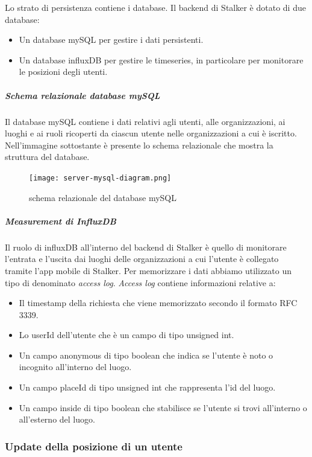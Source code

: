 \documentclass[../manuale-manutentore.tex]{subfiles}
\begin{document}
Lo strato di persistenza contiene i database. Il backend di Stalker è dotato di due database:
\begin{itemize}
  \item Un database mySQL per gestire i dati persistenti.
  \item Un database influxDB per gestire le timeseries, in particolare per monitorare le posizioni degli utenti.
\end{itemize}

\subparagraph{Schema relazionale database mySQL}%
\label{subp:schema_relazionale_database_mysql}
Il database mySQL contiene i dati relativi agli utenti, alle organizzazioni, ai luoghi e ai ruoli ricoperti da ciascun utente nelle organizzazioni a cui è iscritto.
Nell'immagine sottostante è presente lo schema relazionale che mostra la struttura del database.
\begin{figure}[H]
  \centering
  \texttt{[image: server-mysql-diagram.png]}
  \caption{schema relazionale del database mySQL}%
   \label{fig: schema relazionale del database mySQL}
\end{figure}


\subparagraph{Measurement di InfluxDB}%
\label{subp:measurement_di_influxDB}

Il ruolo di influxDB all'interno del backend di Stalker è quello di monitorare l'entrata e l'uscita dai luoghi delle organizzazioni a cui l'utente è collegato tramite l'app mobile di Stalker.
Per memorizzare i dati abbiamo utilizzato un tipo di  denominato \textit{access log}. \textit{Access log}  contiene informazioni relative a:
\begin{itemize}
  \item Il timestamp della richiesta che viene memorizzato secondo il formato RFC 3339.
  \item Lo userId dell'utente che è un campo di tipo unsigned int.
  \item Un campo anonymous di tipo boolean che indica se l'utente è noto o incognito all'interno del luogo.
  \item Un campo placeId di tipo unsigned int che rappresenta l'id del luogo.
  \item Un campo inside di tipo boolean che stabilisce se l'utente si trovi all'interno o all'esterno del luogo.
\end{itemize}

\subsubsection{Update della posizione di un utente}%
\label{subs:update_della_posizione_di_un_utente}
\end{document}
